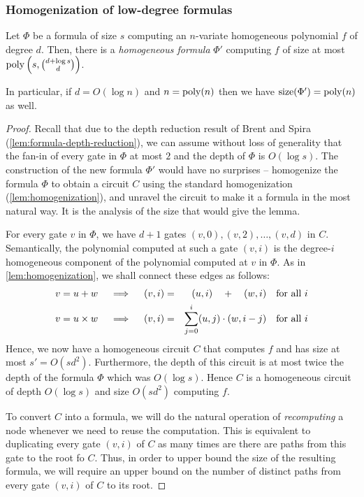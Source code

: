 \subsubsection*{Homogenization of low-degree formulas}

\begin{lemma}\label{lem:formula-homogenization} Let $\Phi$ be a formula of size $s$ computing an $n$-variate homogeneous polynomial $f$ of degree $d$. Then, there is a \emph{homogeneous formula} $\Phi'$ computing $f$ of size at most $\operatorname{poly}\left(s,\binom{d+\log s}{d}\right)$. 

In particular, if $d = O(\log n)$ and $n = \operatorname{poly}(n)$ then we have $\mathrm{size}(\Phi') = \operatorname{poly}(n)$ as well. 
\end{lemma}
\begin{proof}
Recall that due to the depth reduction result of Brent and Spira (\autoref{lem:formula-depth-reduction}), we can assume without loss of generality that the fan-in of every gate in $\Phi$ at most $2$ and the depth of $\Phi$ is $O(\log s)$.
The construction of the new formula $\Phi'$ would have no surprises -- homogenize the formula $\Phi$ to obtain a circuit $C$ using the standard homogenization (\autoref{lem:homogenization}), and unravel the circuit to make it a formula in the most natural way. It is the analysis of the size that would give the lemma. 

\medskip

For every gate $v$ in $\Phi$, we have $d+1$ gates $(v, 0), (v, 2), \ldots, (v, d)$ in $C$.
Semantically, the polynomial computed at such a gate $(v, i)$ is the degree-$i$ homogeneous component of the polynomial computed at $v$ in $\Phi$. As in \autoref{lem:homogenization}, we shall connect these edges as follows:
\begin{eqnarray*}
v = u+w\quad\implies\quad (v, i) &=& (u, i) \quad + \quad (w,i)\quad\text{for all $i$}\\
v = u\times w\quad\implies\quad (v, i) &=& \sum_{j=0}^i (u,j)\cdot (w, {i-j}) \quad\text{for all $i$}
\end{eqnarray*}
Hence, we now have a homogeneous circuit $C$ that computes $f$ and has size at most $s' = O(sd^2)$. Furthermore, the depth of this circuit is at most twice the depth of the formula $\Phi$ which was $O(\log s)$. Hence $C$ is a homogeneous circuit of depth $O(\log s)$ and size $O(sd^2)$ computing $f$. 

To convert $C$ into a formula, we will do the natural operation of \emph{recomputing} a node whenever we need to reuse the computation. This is equivalent to duplicating every gate $(v,i)$ of $C$ as many times are there are paths from this gate to the root fo $C$.
Thus, in order to upper bound the size of the resulting formula, we will require an upper bound on the number of distinct paths from every gate $(v,i)$ of $C$ to its root.


\end{proof}
